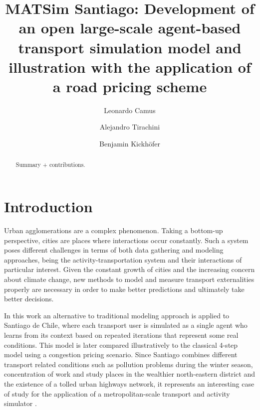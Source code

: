 \documentclass[Journal,letterpaper]{ascelike-new}
\begin{document}
\title{MATSim Santiago: Development of an open large-scale agent-based transport simulation model and illustration with the application of a road pricing scheme}

\author[1]{Leonardo Camus}
\author[2]{Alejandro Tirachini}
\author[3]{Benjamin Kickh\"ofer}


\maketitle



\begin{abstract}
Summary + contributions.
\end{abstract}

\section{Introduction}

Urban agglomerations are a complex phenomenon. Taking a bottom-up perspective, cities are places where interactions occur constantly. Such a system poses different challenges in terms of both data gathering and modeling approaches, being the activity-transportation system and their interactions of particular interest. Given the constant growth of cities and the increasing concern about climate change, new methods to model and measure transport externalities properly are necessary in order to make better predictions and ultimately take better decisions.

In this work an alternative to traditional modeling approach is applied to Santiago de Chile, where each transport user is simulated as a single agent who learns from its context based on repeated iterations that represent some real conditions. This model is later compared illustratively to the classical 4-step model using a congestion pricing scenario. Since Santiago combines different transport related conditions such as pollution problems during the winter season, concentration of work and study places in the wealthier north-eastern district and the existence of a tolled urban highways network, it represents an interesting case of study for the application of a metropolitan-scale transport and activity simulator \citep{KickhoeferEtAl2016}.
\end{document}
